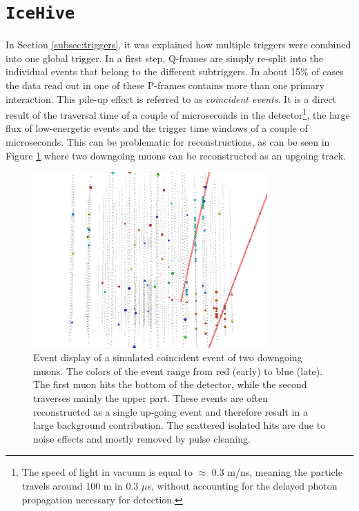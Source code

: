 \section{\texttt{IceHive}}
\label{sec:icehive}
In Section \ref{subsec:triggers}, it was explained how multiple triggers were combined into one global trigger. In a first step, Q-frames are simply re-split into the individual events that belong to the different subtriggers. In about 15\% of cases the data read out in one of these P-frames contains more than one primary interaction. This pile-up effect is referred to as \textit{coincident events}. It is a direct result of the traversal time of a couple of microseconds in the detector\footnote{The speed of light in vacuum is equal to $\approx$ 0.3 m/ns, meaning the particle travels around 100 m in 0.3 $\mu$s, without accounting for the delayed photon propagation necessary for detection.}, the large flux of low-energetic events and the trigger time windows of a couple of microseconds. This can be problematic for reconstructions, as can be seen in Figure \ref{fig:coincidentevent} where two downgoing muons can be reconstructed as an upgoing track.\\

\begin{figure}[t]
\centering
\includegraphics[width=0.8\textwidth]{chapter7/img/coincidenteventsCORS.png}
\caption{Event display of a simulated coincident event of two downgoing muons. The colors of the event range from red (early) to blue (late). The first muon hits the bottom of the detector, while the second traverses mainly the upper part. These events are often reconstructed as a single up-going event and therefore result in a large background contribution. The scattered isolated hits are due to noise effects and mostly removed by pulse cleaning.}
\label{fig:coincidentevent}
\end{figure}

